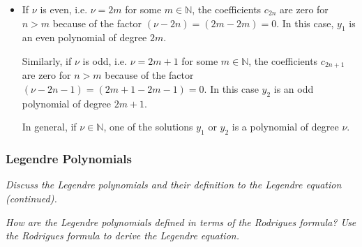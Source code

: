 \documentclass[11pt, a4paper]{article}
\newcommand{\question}[1]{\textit{#1}\vspace{2mm}}
\begin{document}
\begin{itemize}
	\item If $ \nu $ is even, i.e. $ \nu = 2m $ for some $ m \in \mathbb{N} $, the coefficients $ c_{2n} $ are zero for $ n > m $ because of the factor $ (\nu - 2n) = (2m - 2m) = 0 $. In this case, $ y_{1} $ is an even polynomial of degree $ 2m $. 
	
	Similarly, if $ \nu $ is odd, i.e. $ \nu = 2m + 1 $ for some $ m \in \mathbb{N} $, the coefficients $ c_{2n+1} $ are zero for $ n > m $ because of the factor $ (\nu - 2n -1) = (2m + 1 - 2m - 1) = 0 $. In this case $ y_{2} $ is an odd polynomial of degree $ 2m + 1 $.
	
	In general, if $ \nu \in \mathbb{N} $, one of the solutions $ y_{1} $ or $ y_{2} $ is a polynomial of degree $ \nu $.
\end{itemize}



\subsubsection{Legendre Polynomials}
\question{Discuss the Legendre polynomials and their definition to the Legendre equation (continued).}

\question{How are the Legendre polynomials defined in terms of the Rodrigues formula? Use the Rodrigues formula to derive the Legendre equation.}
\end{document}
